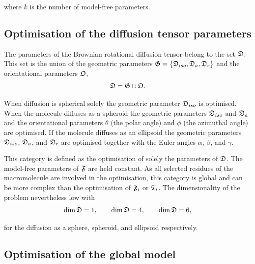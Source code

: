 \noindent where $k$ is the number of model-free parameters.




\subsection{Optimisation of the diffusion tensor parameters}

The parameters of the Brownian rotational diffusion tensor belong to the set $\mathfrak{D}$.
This set is the union of the geometric parameters $\mathfrak{G} = \{\mathfrak{D}_{iso}, \mathfrak{D}_a, \mathfrak{D}_r\}$ and the orientational parameters $\mathfrak{O}$,
\begin{equation}
    \mathfrak{D} = \mathfrak{G} \cup \mathfrak{O}.
\end{equation}

\noindent When diffusion is spherical solely the geometric parameter $\mathfrak{D}_{iso}$ is optimised.
When the molecule diffuses as a spheroid the geometric parameters $\mathfrak{D}_{iso}$ and $\mathfrak{D}_a$ and the orientational parameters $\theta$ (the polar angle) and $\phi$ (the azimuthal angle) are optimised.
If the molecule diffuses as an ellipsoid the geometric parameters $\mathfrak{D}_{iso}$, $\mathfrak{D}_a$, and $\mathfrak{D}_r$ are optimised together with the Euler angles $\alpha$, $\beta$, and $\gamma$.

This category is defined as the optimisation of solely the parameters of $\mathfrak{D}$.
The model-free parameters of $\mathfrak{F}$ are held constant.
As all selected residues of the macromolecule are involved in the optimisation, this category is global and can be more complex than the optimisation of $\mathfrak{F}_i$ or $\mathfrak{T}_i$.
The dimensionality of the problem nevertheless low with
\begin{equation}
    \dim \mathfrak{D} = 1, \qquad \dim \mathfrak{D} = 4, \qquad \dim \mathfrak{D} = 6,
\end{equation}

\noindent for the diffusion as a sphere, spheroid, and ellipsoid respectively.




\subsection{Optimisation of the global model}

